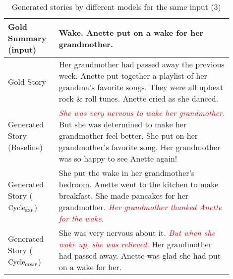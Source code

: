 \begin{table}[h]
\centering
\begin{tabular}{p{0.2\linewidth} | p{0.7\linewidth}}
Gold Summary (input)  & Wake. Anette put on a wake for her grandmother. \\ \hline
Gold Story & Her grandmother had passed away the previous week. Anette put together a playlist of her grandma's favorite songs. They were all upbeat rock \& roll tunes. Anette cried as she danced. \\ \hline
Generated Story (Baseline) & \textcolor{red}{\textit{She was very nervous to wake her grandmother.}} But she was determined to make her grandmother feel better. She put on her grandmother's favorite song. Her grandmother was so happy to see Anette again! \\ \hline
Generated Story ($\text{Cycle}_{\textsc{exp}}$) & She put the wake in her grandmother's bedroom. Anette went to the kitchen to make breakfast. She made pancakes for her grandmother. \textcolor{red}{\textit{Her grandmother thanked Anette for the wake.}} \\ \hline
Generated Story ($\text{Cycle}_{\textsc{comp}}$) & She was very nervous about it. \textcolor{red}{\textit{But when she woke up, she was relieved.}} Her grandmother had passed away. Anette was glad she had put on a wake for her.
\end{tabular}
\caption{Generated stories by different models for the same input (3)}
\label{tab:comp-sample-3}
\end{table}

